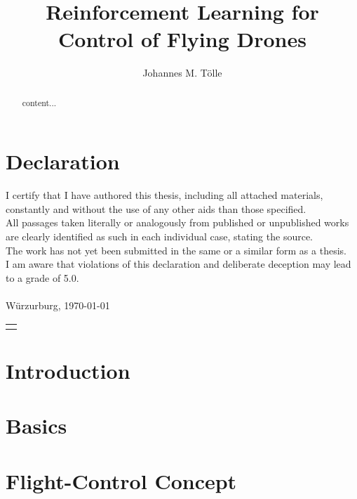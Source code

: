 \documentclass[bachelor,english]{infothesis}
\title{Reinforcement Learning for Control of Flying Drones}
\author{Johannes M. Tölle}
\newenvironment{declaration}
{\chapter*{Declaration}}
{\clearpage}
\begin{document}
	
\begin{declaration}
	I certify that I have authored this thesis, including all attached materials,
	constantly and without the use of any other aids than those specified.\\
	All passages taken literally or analogously from published or unpublished works
	are clearly identified as such in each individual case, stating the source.\\
	The work has not yet been submitted in the same or a similar form as a thesis.\\
	I am aware that violations of this declaration and deliberate deception may lead to
	a grade of 5.0.\\
	\vspace*{12cm}\\
	Würzurburg, \today 
	\hspace*{\fill}\begin{tabular}{@{}l@{}}\hline
	\makebox[4cm]{Johannes M. Tölle}
	\end{tabular}
\end{declaration}

\tableofcontents
\listoffigures
\listoftables
\listofalgorithms

\newpage

\begin{abstract}
	content...
\end{abstract}








\setcounter{page}{1}
\chapter{Introduction}
	

\chapter{Basics}
	

%	
	
\chapter{Flight-Control Concept}
	
\end{document}
